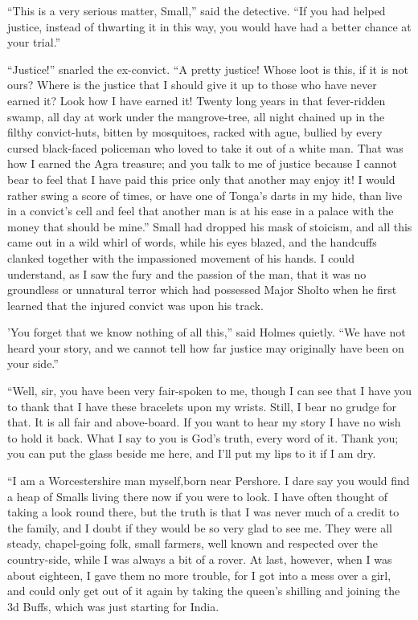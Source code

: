 \documentclass[12pt,english,oneside]{book}
\begin{document}
{}``This is a very serious matter, Small,'' said the detective.
{}``If you had helped justice, instead of thwarting it in this way,
you would have had a better chance at your trial.''

{}``Justice!'' snarled the ex-convict. {}``A pretty justice! Whose
loot is this, if it is not ours? Where is the justice that I should
give it up to those who have never earned it? Look how I have earned
it! Twenty long years in that fever-ridden swamp, all day at work
under the mangrove-tree, all night chained up in the filthy convict-huts,
bitten by mosquitoes, racked with ague, bullied by every cursed black-faced
policeman who loved to take it out of a white man. That was how I
earned the Agra treasure; and you talk to me of justice because I
cannot bear to feel that I have paid this price only that another
may enjoy it! I would rather swing a score of times, or have one of
Tonga's darts in my hide, than live in a convict's cell and feel that
another man is at his ease in a palace with the money that should
be mine.'' Small had dropped his mask of stoicism, and all this came
out in a wild whirl of words, while his eyes blazed, and the handcuffs
clanked together with the impassioned movement of his hands. I could
understand, as I saw the fury and the passion of the man, that it
was no groundless or unnatural terror which had possessed Major Sholto
when he first learned that the injured convict was upon his track.

'You forget that we know nothing of all this,'' said Holmes quietly.
{}``We have not heard your story, and we cannot tell how far justice
may originally have been on your side.''

{}``Well, sir, you have been very fair-spoken to me, though I can
see that I have you to thank that I have these bracelets upon my wrists.
Still, I bear no grudge for that. It is all fair and above-board.
If you want to hear my story I have no wish to hold it back. What
I say to you is God's truth, every word of it. Thank you; you can
put the glass beside me here, and I'll put my lips to it if I am dry.

{}``I am a Worcestershire man myself,\mdsh{---}born near Pershore.
I dare say you would find a heap of Smalls living there now if you
were to look. I have often thought of taking a look round there, but
the truth is that I was never much of a credit to the family, and
I doubt if they would be so very glad to see me. They were all steady,
chapel-going folk, small farmers, well known and respected over the
country-side, while I was always a bit of a rover. At last, however,
when I was about eighteen, I gave them no more trouble, for I got
into a mess over a girl, and could only get out of it again by taking
the queen's shilling and joining the 3d Buffs, which was just starting
for India.
\end{document}

